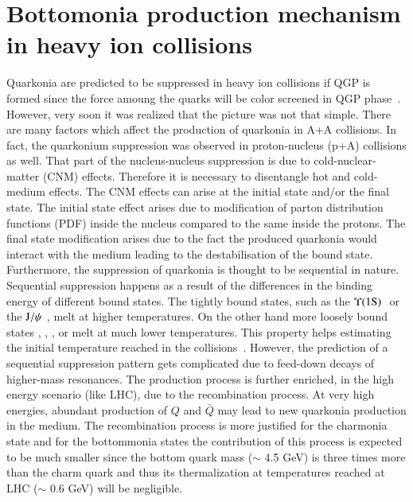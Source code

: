 \section{Bottomonia production mechanism in heavy ion collisions}
\label{sec:Bottomonia_hi}

Quarkonia are predicted to be suppressed in heavy ion collisions
if QGP is formed since the force amoung the quarks will be color screened
in QGP phase~\cite{Matsui:1986dk}.
 However, very soon it was realized that the picture was not that simple.
There are many factors which affect the production of quarkonia in A+A collisions. 
In fact, the quarkonium suppression was observed in proton-nucleus (p+A)
collisions as well.
That part of the nucleus-nucleus suppression is due to 
cold-nuclear-matter (CNM) effects. Therefore it is necessary to disentangle hot 
and cold-medium effects. The CNM effects can arise at the initial
state and/or the final state. The initial state effect
arises due to modification of parton distribution functions (PDF) inside the nucleus
compared to the same inside the protons. The final state modification 
arises due to the  fact the produced quarkonia would interact with the medium
leading to the destabilisation of the bound state. Furthermore, the suppression of
quarkonia is thought to be sequential in nature. Sequential suppression
happens as a result of the differences in the  binding energy of different bound states. 
The tightly bound states, such as the $\Upsilon\mathrm{(1S)}\hspace {0.05in}$ or the $\mathrm{J}/\psi\hspace {0.05in}$,  melt at higher 
temperatures. On the other hand  more loosely bound states \psiP, \chic, \chib, 
\upsb or \upsc  melt at much lower temperatures. This property helps  
estimating the initial temperature reached in 
the collisions~\cite{Digal:2001ue}. However, the prediction of a sequential 
suppression pattern gets complicated due to feed-down 
decays of higher-mass resonances. The production process is further 
enriched, in the high energy scenario (like LHC), due to the recombination process. At very 
high energies, abundant production of $Q$ and $\bar Q$ may lead to new quarkonia production 
in the medium. The recombination process is more justified for the charmonia state and 
for the bottommonia states the contribution of this process is expected to be much
smaller since the bottom quark mass ($\sim$ 4.5 GeV) is three times more than the
charm quark and thus its thermalization at temperatures reached at LHC
($\sim$ 0.6 GeV) will be negligible. 





